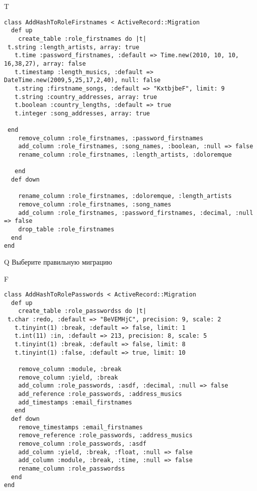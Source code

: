 T
\begin{verbatim}
class AddHashToRoleFirstnames < ActiveRecord::Migration
  def up
    create_table :role_firstnames do |t|
 t.string :length_artists, array: true
   t.time :password_firstnames, :default => Time.new(2010, 10, 10, 16,38,27), array: false
   t.timestamp :length_musics, :default => DateTime.new(2009,5,25,17,2,40), null: false
   t.string :firstname_songs, :default => "KxtbjbeF", limit: 9
   t.string :country_addresses, array: true
   t.boolean :country_lengths, :default => true
   t.integer :song_addresses, array: true

 end
    remove_column :role_firstnames, :password_firstnames
    add_column :role_firstnames, :song_names, :boolean, :null => false
    rename_column :role_firstnames, :length_artists, :doloremque

   end
  def down

    rename_column :role_firstnames, :doloremque, :length_artists
    remove_column :role_firstnames, :song_names
    add_column :role_firstnames, :password_firstnames, :decimal, :null => false
    drop_table :role_firstnames
  end
end
\end{verbatim}
Q
Выберите правильную миграцию

F
\begin{verbatim}
class AddHashToRolePasswords < ActiveRecord::Migration
  def up
    create_table :role_passwordss do |t| 
 t.char :redo, :default => "BeVEMHjC", precision: 9, scale: 2
   t.tinyint(1) :break, :default => false, limit: 1
   t.int(11) :in, :default => 213, precision: 8, scale: 5
   t.tinyint(1) :break, :default => false, limit: 8
   t.tinyint(1) :false, :default => true, limit: 10

    remove_column :module, :break
    remove_column :yield, :break
    add_column :role_passwords, :asdf, :decimal, :null => false
    add_reference :role_passwords, :address_musics
    add_timestamps :email_firstnames
   end
  def down
    remove_timestamps :email_firstnames
    remove_reference :role_passwords, :address_musics
    remove_column :role_passwords, :asdf
    add_column :yield, :break, :float, :null => false
    add_column :module, :break, :time, :null => false
    rename_column :role_passwordss
  end
end
\end{verbatim}

